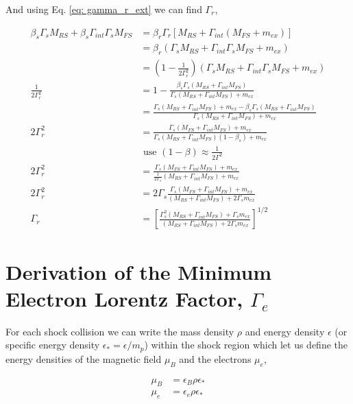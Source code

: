 \documentclass[linenumbers,twocolumn]{aastex631}
\begin{document}
\begin{appendix}
And using Eq. \ref{eq: gamma_r_ext} we can find $\Gamma_r$,

\begin{align}
	\beta_s\Gamma_sM_{RS} + \beta_s\Gamma_{int}\Gamma_sM_{FS} &= \beta_r\Gamma_r[M_{RS} + \Gamma_{int}(M_{FS} + m_{ex})]\\
	&= \beta_r (\Gamma_sM_{RS} + \Gamma_{int}\Gamma_sM_{FS} + m_{ex})\\
	&= \left(1 - \frac{1}{2\Gamma_r^2}\right) (\Gamma_sM_{RS} + \Gamma_{int}\Gamma_sM_{FS} + m_{ex})\\
	\frac{1}{2\Gamma_r^2} &= 1 - \frac{\beta_s\Gamma_s(M_{RS}+\Gamma_{int}M_{FS})}{\Gamma_s(M_{RS}+\Gamma_{int}M_{FS}) + m_{ex}}\\
	&= \frac{\Gamma_s(M_{RS}+\Gamma_{int}M_{FS}) + m_{ex} - \beta_s\Gamma_s(M_{RS}+\Gamma_{int}M_{FS})}{\Gamma_s(M_{RS}+\Gamma_{int}M_{FS})+m_{ex}}\\
	2\Gamma_r^2 &= \frac{\Gamma_s(M_{FS}+\Gamma_{int}M_{FS})+m_{ex}}{\Gamma_s(M_{RS}+\Gamma_{int}M_{FS})(1-\beta_s) + m_{ex}}\\
	&\text{ use } (1-\beta) \approx \frac{1}{2\Gamma^2}\\
	2\Gamma_r^2 &= \frac{\Gamma_s(M_{FS}+\Gamma_{int}M_{FS})+m_{ex}}{\frac{1}{2\Gamma_s}(M_{RS}+\Gamma_{int}M_{FS}) + m_{ex}}\\
	2\Gamma_r^2 &= 2\Gamma_s\frac{\Gamma_s(M_{FS}+\Gamma_{int}M_{FS})+m_{ex}}{(M_{RS}+\Gamma_{int}M_{FS}) + 2\Gamma_sm_{ex}}\\
	\Gamma_r &= \left[ \frac{\Gamma_s^2(M_{RS} + \Gamma_{int}M_{FS}) + \Gamma_sm_{ex}}{(M_{RS} + \Gamma_{int}M_{FS})+2\Gamma_sm_{ex}}\right]^{1/2}
\end{align}



\section[Derivation of the Minimum Electron Lorentz Factor, Gamma_e]{Derivation of the Minimum Electron Lorentz Factor, $\Gamma_e$} \label{sec: gamma_e}

For each shock collision we can write the mass density $\rho$ and energy density $\epsilon$ (or specific energy density $\epsilon_* = \epsilon/m_p$) within the shock region which let us define the energy densities of the magnetic field $\mu_B$ and the electrons $\mu_e$,

\begin{align}
	\mu_B &= \epsilon_B \rho \epsilon_*\\
	\mu_e &= \epsilon_e \rho \epsilon_*
\end{align}


\end{appendix}
\end{document}
